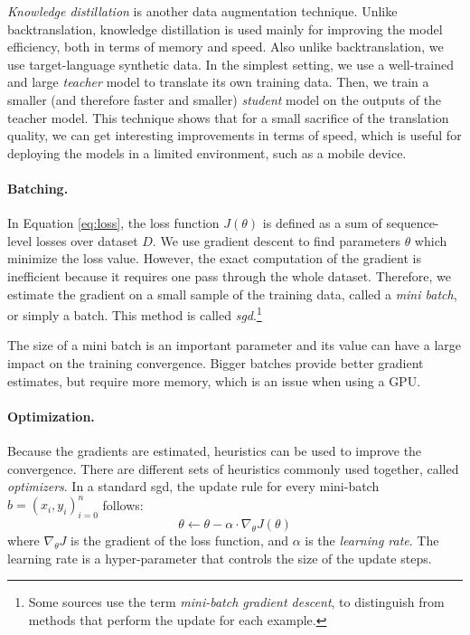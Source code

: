 \emph{Knowledge distillation} \citep{kim-rush-2016-sequence} is another data
augmentation technique. Unlike backtranslation, knowledge distillation is used
mainly for improving the model efficiency, both in terms of memory and speed.
Also unlike backtranslation, we use target-language synthetic data. In the
simplest setting, we use a well-trained and large \emph{teacher} model to
translate its own training data. Then, we train a smaller (and therefore faster
and smaller) \emph{student} model on the outputs of the teacher model. This
technique shows that for a small sacrifice of the translation quality, we can
get interesting improvements in terms of speed, which is useful for deploying
the models in a limited environment, such as a mobile device.

\paragraph{Batching.} In Equation \ref{eq:loss}, the loss function
$J(\theta)$ is defined as a sum of sequence-level losses over dataset
$D$. We use gradient descent to find parameters $\theta$ which minimize the
loss value. However, the exact computation of the gradient is inefficient
because it requires one pass through the whole dataset. Therefore, we estimate
the gradient on a small sample of the training data, called a \emph{mini
  batch}, or simply a batch. This method is called
\emph{\gls{sgd}}.\footnote{Some sources use the term \emph{mini-batch gradient
    descent}, to distinguish from methods that perform the update for each
  example.}

The size of a mini batch is an important parameter and its value can have a
large impact on the training convergence. Bigger batches provide better
gradient estimates, but require more memory, which is an issue when using a
GPU.




\paragraph{Optimization.}
Because the gradients are estimated, heuristics can be used to improve the
convergence. There are different sets of heuristics commonly used together,
called \emph{optimizers}. In a standard \gls{sgd}, the update rule for every
mini-batch $b = (x_i, y_i)_{i=0}^{n}$ follows:
%
\begin{equation}
  \theta \gets \theta - \alpha  \cdot \nabla_{\theta}  J(\theta)
\end{equation}
%
where $\nabla_{\theta} J$ is the gradient of the loss function, and
$\alpha$ is the \emph{learning rate}. The learning rate is a hyper-parameter
that controls the size of the update steps.

